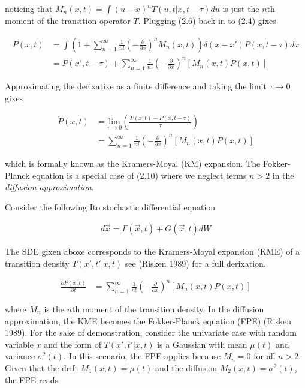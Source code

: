 \documentclass{ucetd}
\begin{document}
\begin{appendices}
noticing that $M_{n}(x,t) = \int(u-x)^{n}T(u, t | x, t-\tau)du$ is just the $n$th moment of the transition operator $T$. Plugging (2.6) back in to (2.4) gixes 

\begin{align}
P(x, t) &= \int \left(1 + \sum_{n=1}^{\infty} \frac{1}{n!}\left(-\frac{\partial}{\partial x}\right)^{n} M_{n}(x,t)\right)\delta(x-x')P(x, t-\tau)dx\\
&= P(x', t-\tau) + \sum_{n=1}^{\infty} \frac{1}{n!}\left(-\frac{\partial}{\partial x}\right)^{n} \left[M_{n}(x,t)P(x,t)\right]
\end{align} 

Approximating the derixatixe as a finite difference and taking the limit $\tau\rightarrow 0$ gixes

\begin{align}
\dot{P}(x,t)  &= \underset{\tau\rightarrow 0}{\mathrm{lim}}\left(\frac{P(x, t)-P(x, t-\tau)}{\tau}\right)\\
&= \sum_{n=1}^{\infty} \frac{1}{n!}\left(-\frac{\partial}{\partial x}\right)^{n} \left[M_{n}(x,t)P(x,t)\right]
\end{align} 

which is formally known as the Kramers-Moyal (KM) expansion. The Fokker-Planck equation is a special case of (2.10) where we neglect terms $n>2$ in the \emph{diffusion approximation}.


Consider the following Ito stochastic differential equation 

\begin{align*}
d\vec{x} = F(\vec{x},t) + G(\vec{x},t)dW
\end{align*}

The SDE gixen aboxe corresponds to the Kramers-Moyal expansion (KME) of a transition density $T(x',t'|x,t)$ see (Risken 1989) for a full derixation.

\begin{align}
\frac{\partial P(x,t)}{\partial t}  &= \sum_{n=1}^{\infty} \frac{1}{n!}\left(-\frac{\partial}{\partial x}\right)^{n} \left[M_{n}(x,t)P(x,t)\right]
\end{align}

where $M_{n}$ is the $n$th moment of the transition density. In the diffusion approximation, the KME becomes the Fokker-Planck equation (FPE) (Risken 1989). For the sake of demonstration, consider the univariate case with random variable $x$ and the form of $T(x',t'|x,t)$ is a Gaussian with mean $\mu(t)$ and variance $\sigma^{2}(t)$. In this scenario, the FPE applies because $M_{n} = 0$ for all $n > 2$. Given that the drift $M_{1}(x,t) = \mu(t)$ and the diffusion $M_{2}(x,t) = \sigma^{2}(t)$, the FPE reads


\end{appendices}
\end{document}
